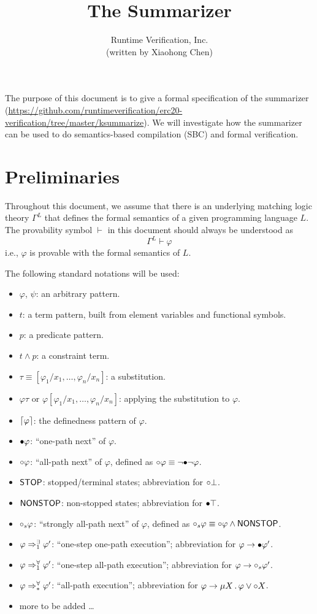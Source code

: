 \documentclass{article}
\title{The \K Summarizer}
\author{Runtime Verification, Inc.\\(written by Xiaohong Chen)}
\begin{document}
\maketitle

The purpose of this document is to give a formal specification of
the \K summarizer (\url{https://github.com/runtimeverification/erc20-verification/tree/master/ksummarize}).
We will investigate how the \K summarizer can be used to do semantics-based compilation (SBC) and formal verification. 

\section{Preliminaries}

Throughout this document, we assume that there is an 
underlying matching logic theory $\Gamma^L$ that defines the formal semantics
of a given programming language $L$. 
The provability symbol $\vdash$ in this document should always be understood as
\[\Gamma^L \vdash \varphi\]
i.e., $\varphi$ is provable with the formal semantics of $L$. 

The following standard notations will be used:
\begin{itemize}\renewcommand\labelitemi{--}
\item $\varphi$, $\psi$: an arbitrary pattern.
\item $t$: a term pattern, built from element variables and functional symbols.
\item $p$: a predicate pattern.
\item $t \land p$: a constraint term. 
\item $\tau \equiv [\varphi_1 / x_1 , \dots , \varphi_n / x_n]$: a substitution.
\item $\varphi\tau$ or $\varphi[\varphi_1 / x_1 , \dots , \varphi_n / x_n]$:
       applying the substitution to $\varphi$.
\item $\lceil\varphi\rceil$: the definedness pattern of $\varphi$.
\item $\mathord{\bullet} \varphi$: ``one-path next'' of $\varphi$.
\item $\mathord{\circ} \varphi$: ``all-path next'' of $\varphi$, defined as
 $\mathord{\circ} \varphi \equiv \lnot \mathord{\bullet} \lnot \varphi$.
\item $\mathsf{STOP}$: stopped/terminal states; abbreviation for $\mathord{\circ} \bot$.
\item $\mathsf{NONSTOP}$: non-stopped states; abbreviation for $\mathord{\bullet} \top$. 
\item $\mathord{\circ}_s \varphi$: ``strongly all-path next'' of $\varphi$,
defined as $\mathord{\circ}_s \varphi \equiv \mathord{\circ} \varphi \land \mathsf{NONSTOP}$. 
\item $\varphi \Rightarrow^{\exists}_{1} \varphi'$: ``one-step one-path execution''; abbreviation for $\varphi \rightarrow \mathord{\bullet} \varphi'$.
\item $\varphi \Rightarrow^{\forall}_{1} \varphi'$: ``one-step all-path execution'';
abbreviation for $\varphi \rightarrow \mathord{\circ}_s \varphi'$.
\item $\varphi \Rightarrow^{\forall}_{*} \varphi'$: ``all-path execution'';
abbreviation for $\varphi \rightarrow \mu X \,.\, \varphi \lor \mathord{\circ} X$.
\item more to be added \ldots
\end{itemize}
\end{document}

